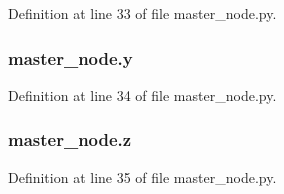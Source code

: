 Definition at line 33 of file master\+\_\+node.\+py.

\subsubsection[{\texorpdfstring{y}{y}}]{\setlength{\rightskip}{0pt plus 5cm}master\+\_\+node.\+y}\hypertarget{namespacemaster__node_ac413c2def2fcd170aa78888c2e13b0ce}{}\label{namespacemaster__node_ac413c2def2fcd170aa78888c2e13b0ce}


Definition at line 34 of file master\+\_\+node.\+py.

\subsubsection[{\texorpdfstring{z}{z}}]{\setlength{\rightskip}{0pt plus 5cm}master\+\_\+node.\+z}\hypertarget{namespacemaster__node_a0aa1d242f836be42c9db48fd53ee63f4}{}\label{namespacemaster__node_a0aa1d242f836be42c9db48fd53ee63f4}


Definition at line 35 of file master\+\_\+node.\+py.

